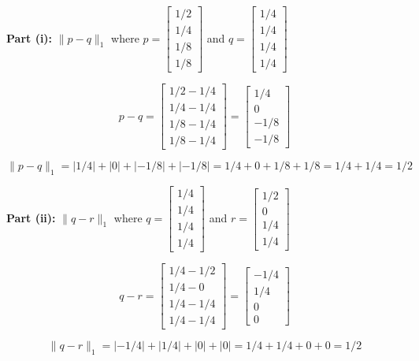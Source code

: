\documentclass{article}
\begin{document}
\parbox{\textwidth}{
\textbf{Part (i):} $\|p - q\|_1$ where $p = \begin{bmatrix} 1/2 \\ 1/4 \\ 1/8 \\ 1/8 \end{bmatrix}$ and $q = \begin{bmatrix} 1/4 \\ 1/4 \\ 1/4 \\ 1/4 \end{bmatrix}$

$$p - q = \begin{bmatrix} 1/2 - 1/4 \\ 1/4 - 1/4 \\ 1/8 - 1/4 \\ 1/8 - 1/4 \end{bmatrix} = \begin{bmatrix} 1/4 \\ 0 \\ -1/8 \\ -1/8 \end{bmatrix}$$

$$\|p - q\|_1 = |1/4| + |0| + |-1/8| + |-1/8| = 1/4 + 0 + 1/8 + 1/8 = 1/4 + 1/4 = 1/2$$

\textbf{Part (ii):} $\|q - r\|_1$ where $q = \begin{bmatrix} 1/4 \\ 1/4 \\ 1/4 \\ 1/4 \end{bmatrix}$ and $r = \begin{bmatrix} 1/2 \\ 0 \\ 1/4 \\ 1/4 \end{bmatrix}$

$$q - r = \begin{bmatrix} 1/4 - 1/2 \\ 1/4 - 0 \\ 1/4 - 1/4 \\ 1/4 - 1/4 \end{bmatrix} = \begin{bmatrix} -1/4 \\ 1/4 \\ 0 \\ 0 \end{bmatrix}$$

$$\|q - r\|_1 = |-1/4| + |1/4| + |0| + |0| = 1/4 + 1/4 + 0 + 0 = 1/2$$

}
\end{document}
